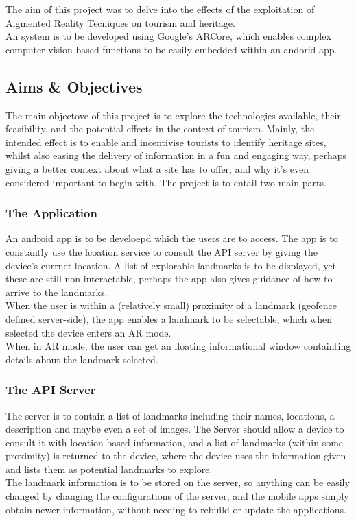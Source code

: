 The aim of this project was to delve into the effects of the exploitation of Aigmented Reality Tecniques on tourism and heritage.\\
An system is to be developed using Google's ARCore, which enables complex computer vision based functions to be easily embedded within an andorid app. 
\subsection{Aims \& Objectives}
The main objectove of this project is to explore the technologies available, their feasibility, and the potential effects in the context of tourism. 
Mainly, the intended effect is to enable and incentivise tourists to identify heritage sites, whilst also easing the delivery of information in a fun and engaging way, perhaps
giving a better context about what a site has to offer, and why it's even considered important to begin with.
The project is to entail two main parts.
\subsubsection{The Application}
An android app is to be develoepd which the users are to access. The app is to constantly use the lcoation service to consult the API server by giving the device's currnet
 location. A list of explorable landmarks is to be displayed, yet these are still non interactable, perhaps the app also gives guidance of how to arrive to
 the landmarks.\\
 When the user is within a (relatively small) proximity of a landmark (geofence defined server-side), the app enables a landmark to be selectable, which when selected the device enters an AR mode.\\
 When in AR mode, the user can get an floating informational window containting details about the landmark selected.
 \subsubsection{The API Server}
 The server is to contain a list of landmarks including their names, locations, a description and maybe even a set of images. The Server should allow a device to consult it with
 location-based information, and a list of landmarks (within some proximity) is returned to the device, where the device uses the information given and lists them as potential landmarks to explore.\\
 The landmark information is to be stored on the server, so anything can be easily changed by changing the configurations of the server, and the mobile apps simply obtain newer information, 
 without needing to rebuild or update the applications.